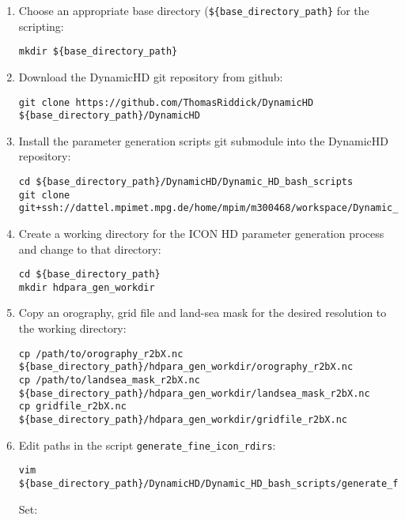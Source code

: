 \documentclass{article}
\begin{document}
\begin{enumerate}

\item Choose an appropriate base directory (\lstinline[style=bash_input]|${base_directory_path}| for the scripting:
\begin{lstlisting}[style=bash_input,breaklines=true]
mkdir ${base_directory_path}
\end{lstlisting}
\item Download the DynamicHD git repository from github:
\begin{lstlisting}[style=bash_input,breaklines=true]
git clone https://github.com/ThomasRiddick/DynamicHD ${base_directory_path}/DynamicHD
\end{lstlisting}
\item Install the parameter generation scripts git submodule into the DynamicHD repository:
\begin{lstlisting}[style=bash_input,breaklines=true] 
cd ${base_directory_path}/DynamicHD/Dynamic_HD_bash_scripts
git clone git+ssh://dattel.mpimet.mpg.de/home/mpim/m300468/workspace/Dynamic_HD_Code/Dynamic_HD_bash_scripts/parameter_generation_scripts 
\end{lstlisting}
\item Create a working directory for the ICON HD parameter generation process and change to that directory:
\begin{lstlisting}[style=bash_input,breaklines=true] 
cd ${base_directory_path}
mkdir hdpara_gen_workdir
\end{lstlisting}
\item Copy an orography, grid file and land-sea mask for the desired resolution to the working directory:
\begin{lstlisting}[style=bash_input,breaklines=true] 
cp /path/to/orography_r2bX.nc ${base_directory_path}/hdpara_gen_workdir/orography_r2bX.nc 
cp /path/to/landsea_mask_r2bX.nc ${base_directory_path}/hdpara_gen_workdir/landsea_mask_r2bX.nc
cp gridfile_r2bX.nc ${base_directory_path}/hdpara_gen_workdir/gridfile_r2bX.nc
\end{lstlisting}
\item Edit paths in the script \lstinline[style=bash_input]{generate_fine_icon_rdirs}:
\begin{lstlisting}[style=bash_input,breaklines=true] 
vim ${base_directory_path}/DynamicHD/Dynamic_HD_bash_scripts/generate_fine_icon_rdirs
\end{lstlisting}
Set:
\begin{lstlisting}[style=bash_input,breaklines=true] 

\end{lstlisting}
\end{enumerate}
\end{document}
